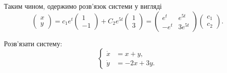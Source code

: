 \begin{solution}
    Таким чином, одержимо розв'язок системи у вигляді
    \[ \begin{pmatrix} x \\ y \end{pmatrix} = c_1 e^t \begin{pmatrix} 1 \\ -1 \end{pmatrix} + C_2 e^{5t} \begin{pmatrix} 1 \\ 3 \end{pmatrix} = \begin{pmatrix} e^t & e^{5t} \\ - e^t & 3 e^{5t} \end{pmatrix} \begin{pmatrix} c_1 \\ c_2 \end{pmatrix}. \]
\end{solution}

\begin{example}
    Розв'язати систему:
    \[ \left\{ \begin{aligned}
        \dot x &= x + y, \\
        \dot y &= -2 x + 3 y.
    \end{aligned} \right. \]
\end{example}

